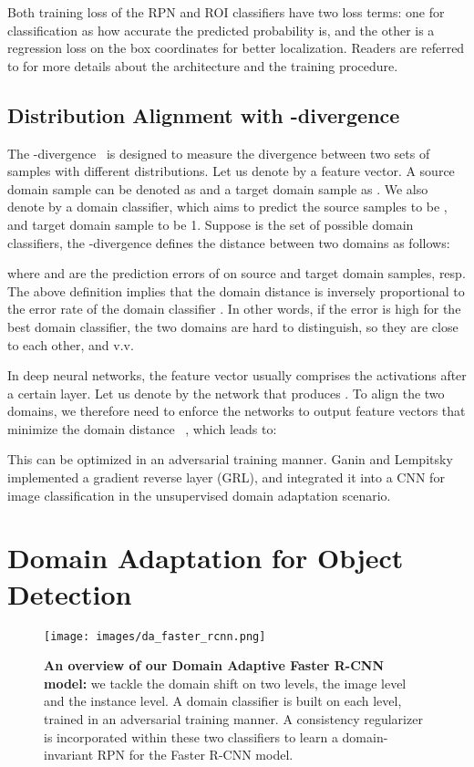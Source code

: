 \documentclass[10pt,twocolumn,letterpaper]{article}
\begin{document}
Both training loss of the RPN and ROI classifiers have two loss terms: one for classification as how accurate the predicted probability is, and the other is a regression loss on the box coordinates for better localization. Readers are referred to \cite{zhang2016Faster} for more details about the architecture and the training procedure.

\subsection{Distribution Alignment with -divergence}
\label{sec:h_divergence}
The -divergence~\cite{ben2010theory} is designed to measure the divergence between two sets of samples with different distributions. Let us denote by  a feature vector. A source domain sample can be denoted as  and a target domain sample as . We also denote by  a domain classifier, which aims to predict the source samples  to be , and target domain sample  to be 1. Suppose  is the set of possible domain classifiers, the -divergence defines the distance between two domains as follows:

where  and  are the prediction errors of  on source and target domain samples, resp. The above definition implies that the domain distance  is inversely proportional to the error rate of the domain classifier . In other words, if the error is high for the best domain classifier, the two domains are hard to distinguish, so they are close to each other, and v.v. 

In deep neural networks, the feature vector  usually comprises the activations after a certain layer. Let us denote by  the network that produces . To align the two domains, we therefore need to enforce the networks  to output feature vectors that minimize the domain distance ~\cite{ganin2015unsupervised}, which leads to:

This can be optimized in an adversarial training manner. Ganin and Lempitsky~\cite{ganin2015unsupervised} implemented a gradient reverse layer (GRL), and integrated it into a CNN for image classification in the unsupervised domain adaptation scenario. 

\section{Domain Adaptation for Object Detection}
\label{sec:dadet}
\begin{figure*}
\centering
\texttt{[image: images/da\_faster\_rcnn.png]}
\caption{\textbf{An overview of our Domain Adaptive Faster R-CNN model:} we tackle the domain shift on two levels, the image level and the instance level. A domain classifier is built on each level, trained in an adversarial training manner. A consistency regularizer is incorporated within these two classifiers to learn a domain-invariant RPN for the Faster R-CNN model.}
\label{fig:da_faster_rcnn}
\vspace{-2mm}
\end{figure*}
\end{document}

